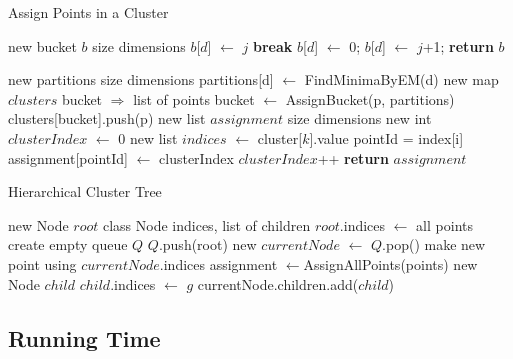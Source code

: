 \documentclass{acm_proc_article-sp}
\begin{document}
\begin{algorithm}
\caption{Assign Points in a Cluster}\label{euclid}
\begin{algorithmic}[1]
\State new bucket $b$ \Comment size dimensions
\State $b$[$d$] $\leftarrow$ $j$
\State \textbf{break}
\EndIf
{}
\State $b$[$d$] $\leftarrow$ 0;
\Else
\State $b$[$d$] $\leftarrow$ $j$+1;
\EndIf
\EndFor
\EndFor
\State \textbf{return} $b$
\EndProcedure
\State

\State new partitions \Comment size dimensions
\State partitions[d] $\leftarrow$ FindMinimaByEM(d)
\EndFor
\State new map $clusters$ \Comment bucket $\Rightarrow$ list of points
\State bucket $\leftarrow$ AssignBucket(p, partitions)
\State clusters[bucket].push(p)
\EndFor
\State new list $assignment$ \Comment size dimensions
\State new int $clusterIndex$ $\leftarrow$ 0
\State new list $indices$ $\leftarrow$ cluster[$k$].value
\State pointId = index[i] 
\State assignment[pointId] $\leftarrow$  clusterIndex
\EndFor
\State $clusterIndex$++
\EndFor
\State \textbf{return} $assignment$
\EndProcedure
\end{algorithmic}
\end{algorithm}


\begin{algorithm}
\caption{Hierarchical Cluster Tree}\label{hct}
\begin{algorithmic}[1]
\State new Node $root$ \Comment class Node indices, list of children
\State $root$.indices $\leftarrow$ all points
\State create empty queue $Q$
\State $Q$.push(root)
\State new $currentNode$ $\leftarrow$ $Q$.pop()
\State make new point using $currentNode$.indices
\State assignment $\leftarrow $AssignAllPoints(points)
\State new Node $child$
\State $child$.indices $\leftarrow$ $g$
\State currentNode.children.add($child$)
\EndFor
\EndWhile
\EndProcedure
\end{algorithmic}
\end{algorithm}

\subsection{Running Time}
\end{document}
